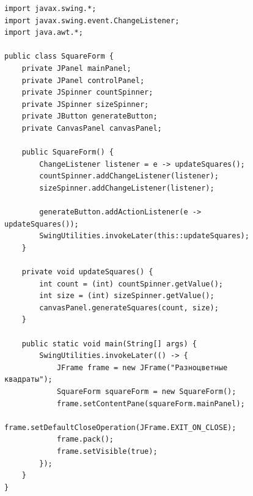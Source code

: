 \documentclass[a4paper, 14pt]{extarticle}
\begin{document}
\newpage
\begin{figure}[!htb]
\begin{lstlisting}[language={},caption={Main file variant 16},label={lst:code2}]
import javax.swing.*;
import javax.swing.event.ChangeListener;
import java.awt.*;

public class SquareForm {
    private JPanel mainPanel;
    private JPanel controlPanel;
    private JSpinner countSpinner;
    private JSpinner sizeSpinner;
    private JButton generateButton;
    private CanvasPanel canvasPanel;

    public SquareForm() {
        ChangeListener listener = e -> updateSquares();
        countSpinner.addChangeListener(listener);
        sizeSpinner.addChangeListener(listener);

        generateButton.addActionListener(e -> updateSquares());
        SwingUtilities.invokeLater(this::updateSquares);
    }

    private void updateSquares() {
        int count = (int) countSpinner.getValue();
        int size = (int) sizeSpinner.getValue();
        canvasPanel.generateSquares(count, size);
    }

    public static void main(String[] args) {
        SwingUtilities.invokeLater(() -> {
            JFrame frame = new JFrame("Разноцветные квадраты");
            SquareForm squareForm = new SquareForm();
            frame.setContentPane(squareForm.mainPanel);
            frame.setDefaultCloseOperation(JFrame.EXIT_ON_CLOSE);
            frame.pack();
            frame.setVisible(true);
        });
    }
}


\end{lstlisting}
\end{figure}
\newpage
\end{document}
